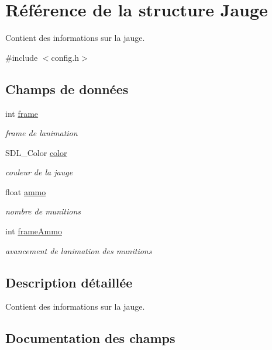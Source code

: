 \hypertarget{struct_jauge}{}\section{Référence de la structure Jauge}
\label{struct_jauge}


Contient des informations sur la jauge.  




{\ttfamily \#include $<$config.\+h$>$}

\subsection*{Champs de données}
\begin{DoxyCompactItemize}
\item 
int \hyperlink{struct_jauge_a8d53c17b4c6d0dd90238f7abd4e29bfe}{frame}
\begin{DoxyCompactList}\small\item\em frame de l\textquotesingle{}animation \end{DoxyCompactList}\item 
S\+D\+L\+\_\+\+Color \hyperlink{struct_jauge_a5426eef58429780fbfcd74f0a4b72eca}{color}
\begin{DoxyCompactList}\small\item\em couleur de la jauge \end{DoxyCompactList}\item 
float \hyperlink{struct_jauge_ac46f70db6c7afc22bf690cee9bd92fb7}{ammo}
\begin{DoxyCompactList}\small\item\em nombre de munitions \end{DoxyCompactList}\item 
int \hyperlink{struct_jauge_ab961d6e627fdeb351ece38dbe069564e}{frame\+Ammo}
\begin{DoxyCompactList}\small\item\em avancement de l\textquotesingle{}animation des munitions \end{DoxyCompactList}\end{DoxyCompactItemize}


\subsection{Description détaillée}
Contient des informations sur la jauge. 

\subsection{Documentation des champs}
\mbox{\label{struct_jauge_ac46f70db6c7afc22bf690cee9bd92fb7}} 
